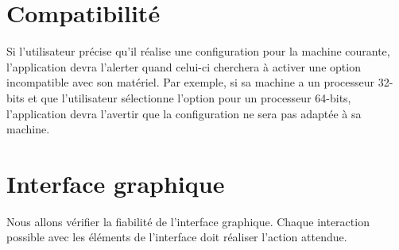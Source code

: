 \documentclass[16pts]{report}
\begin{document}
\section{Compatibilité}
\label{sec:Compatibilité}

Si l'utilisateur précise qu'il réalise une configuration pour la machine
courante, l'application devra l'alerter quand celui-ci cherchera à activer une
option incompatible avec son matériel. Par exemple, si sa machine a un
processeur 32-bits et que l'utilisateur sélectionne l'option pour un processeur
64-bits, l'application devra l'avertir que la configuration ne sera pas adaptée
à sa machine.


\section{Interface graphique}
\label{sec:Interface graphique}

Nous allons vérifier la fiabilité de l'interface graphique. Chaque interaction
possible avec les éléments de l'interface doit réaliser l'action attendue.
\end{document}
